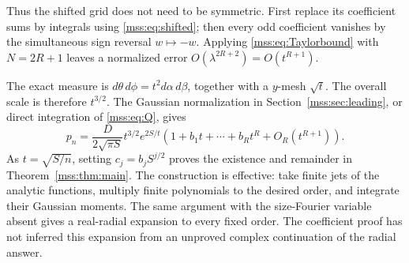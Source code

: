 \documentclass[11pt,letterpaper]{article}
\numberwithin{equation}{section}
\theoremstyle{definition}\newtheorem{definition}[theorem]{Definition}
\theoremstyle{remark}\newtheorem{remark}[theorem]{Remark}
\begin{document}
Thus the shifted grid does not need to be symmetric. First replace its coefficient sums by integrals using \eqref{mss:eq:shifted}; then every odd coefficient vanishes by the simultaneous sign reversal $w\mapsto-w$. Applying \eqref{mss:eq:Taylorbound} with $N=2R+1$ leaves a normalized error $O(\lambda^{2R+2})=O(t^{R+1})$.

The exact measure is $d\theta\,d\phi=t^2d\alpha\,d\beta$, together with a $y$-mesh $\sqrt t$. The overall scale is therefore $t^{3/2}$. The Gaussian normalization in Section~\ref{mss:sec:leading}, or direct integration of \eqref{mss:eq:Q}, gives
\begin{equation}\label{mss:eq:tseries}
p_n=\frac{D}{2\sqrt{\pi S}}t^{3/2}e^{2S/t}
\left(1+b_1t+\cdots+b_Rt^R+O_R(t^{R+1})\right).
\end{equation}
As $t=\sqrt{S/n}$, setting $c_j=b_jS^{j/2}$ proves the existence and remainder in Theorem~\ref{mss:thm:main}. The construction is effective: take finite jets of the analytic functions, multiply finite polynomials to the desired order, and integrate their Gaussian moments. The same argument with the size-Fourier variable absent gives a real-radial expansion to every fixed order. The coefficient proof has not inferred this expansion from an unproved complex continuation of the radial answer.
\end{document}
